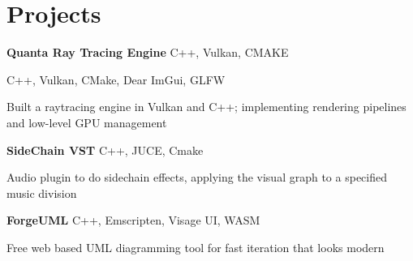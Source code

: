 
\newenvironment{twocolentry_proj}[2][]{
    \onecolentry
    \def\secondColumn{#2}
    \setcolumnwidth{\fill, 7 cm}
    \begin{paracol}{2}
}{
    \switchcolumn \raggedleft \secondColumn
    \end{paracol}
    \endonecolentry
} %

\vspace{5 pt - 0.5 cm}
\section{Projects}
\vspace{-0.1 cm}
\begin{twocolentry_proj}{
    \mbox{}%
}
\fontsize{11 pt}{11 pt}\textbf{Quanta Ray Tracing Engine} C++, Vulkan, CMAKE
\end{twocolentry_proj}
\begin{onecolentry}
    C++, Vulkan, CMake, Dear ImGui, GLFW
    \begin{highlights}
        \item Built a raytracing engine in Vulkan and C++; implementing rendering pipelines and low-level GPU management
    \end{highlights}
\end{onecolentry}

\begin{twocolentry_proj}{
    \mbox{}%
}
\fontsize{11 pt}{11 pt}\textbf{SideChain VST} C++, JUCE, Cmake
\end{twocolentry_proj}

\begin{onecolentry}
    \begin{highlights}
        \item Audio plugin to do sidechain effects, applying the visual graph to a specified music division
    \end{highlights}
\end{onecolentry}

\vspace{0.15 cm}
\begin{twocolentry_proj}{
    \mbox{}%
}
\fontsize{11 pt}{11 pt}\textbf{ForgeUML} C++, Emscripten, Visage UI, WASM
\end{twocolentry_proj}
\begin{onecolentry}
    \begin{highlights}
        \item Free web based UML diagramming tool for fast iteration that looks modern
    \end{highlights}
\end{onecolentry}

